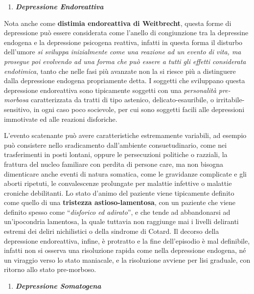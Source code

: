 \documentclass[]{article}
\begin{document}
\begin{enumerate}
\def\labelenumi{\arabic{enumi}.}
\item
  \textbf{\emph{Depressione Endoreattiva}}
\end{enumerate}

Nota anche come \textbf{distimia endoreattiva di Weitbrecht}, questa
forme di depressione può essere considerata come l'anello di
congiunzione tra la depressine endogena e la depressione psicogena
reattiva, infatti in questa forma il disturbo dell'umore \emph{si
sviluppa inizialmente come una reazione ad un evento di vita, ma
prosegue poi evolvendo ad una forma che può essere a tutti gli effetti
considerata endotimica}, tanto che nelle fasi più avanzate non la si
riesce più a distinguere dalla depressione endogena propriamente detta.
I soggetti che sviluppano questa depressione endoreattiva sono
tipicamente soggetti con una \emph{personalità pre-morbosa}
caratterizzata da tratti di tipo astenico, delicato-esauribile, o
irritabile-sensitivo, in ogni caso poco socievole, per cui sono soggetti
facili alle depressioni immotivate ed alle reazioni disforiche.

L'evento scatenante può avere caratteristiche estremamente variabili, ad
esempio può consistere nello sradicamento dall'ambiente consuetudinario,
come nei trasferimenti in posti lontani, oppure le persecuzioni
politiche o razziali, la frattura del nucleo familiare con perdita di
persone care, ma non bisogna dimenticare anche eventi di natura
somatica, come le gravidanze complicate e gli aborti ripetuti, le
convalescenze prolungate per malattie infettive o malattie croniche
debilitanti. Lo stato d'animo del paziente viene tipicamente definito
come quello di una \textbf{tristezza astioso-lamentosa}, con un paziente
che viene definito spesso come ``\emph{disforico ed adirato}'', e che
tende ad abbandonarsi ad un'ipocondria lamentosa, la quale tuttavia non
raggiunge mai i livelli deliranti estremi dei deliri nichilistici o
della sindrome di Cotard. Il decorso della depressione endoreattiva,
infine, è protratto e la fine dell'episodio è mal definibile, infatti
non si osserva una risoluzione rapida come nella depressione endogena,
né un viraggio verso lo stato maniacale, e la risoluzione avviene per
lisi graduale, con ritorno allo stato pre-morboso.

\begin{enumerate}
\def\labelenumi{\arabic{enumi}.}
\item
  \textbf{\emph{Depressione Somatogena}}
\end{enumerate}
\end{document}
